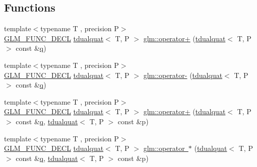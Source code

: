 \subsection*{Functions}
\begin{DoxyCompactItemize}
\item 
{\footnotesize template$<$typename T , precision P$>$ }\\\mbox{\hyperlink{setup_8hpp_ab2d052de21a70539923e9bcbf6e83a51}{G\+L\+M\+\_\+\+F\+U\+N\+C\+\_\+\+D\+E\+CL}} \mbox{\hyperlink{structglm_1_1tdualquat}{tdualquat}}$<$ T, P $>$ \mbox{\hyperlink{group__gtx__dual__quaternion_gaf14cf93205560472618c9f93a52a2e1f}{glm\+::operator+}} (\mbox{\hyperlink{structglm_1_1tdualquat}{tdualquat}}$<$ T, P $>$ const \&\mbox{\hyperlink{glad_8h_a514729309336df22bcc8eda979d6ced4}{q}})
\item 
{\footnotesize template$<$typename T , precision P$>$ }\\\mbox{\hyperlink{setup_8hpp_ab2d052de21a70539923e9bcbf6e83a51}{G\+L\+M\+\_\+\+F\+U\+N\+C\+\_\+\+D\+E\+CL}} \mbox{\hyperlink{structglm_1_1tdualquat}{tdualquat}}$<$ T, P $>$ \mbox{\hyperlink{group__gtx__dual__quaternion_ga90a25279ac4f392a823e8bf6dfaddb9b}{glm\+::operator-\/}} (\mbox{\hyperlink{structglm_1_1tdualquat}{tdualquat}}$<$ T, P $>$ const \&\mbox{\hyperlink{glad_8h_a514729309336df22bcc8eda979d6ced4}{q}})
\item 
{\footnotesize template$<$typename T , precision P$>$ }\\\mbox{\hyperlink{setup_8hpp_ab2d052de21a70539923e9bcbf6e83a51}{G\+L\+M\+\_\+\+F\+U\+N\+C\+\_\+\+D\+E\+CL}} \mbox{\hyperlink{structglm_1_1tdualquat}{tdualquat}}$<$ T, P $>$ \mbox{\hyperlink{group__gtx__dual__quaternion_ga9d7cfca38c6ff90757705600da3c7972}{glm\+::operator+}} (\mbox{\hyperlink{structglm_1_1tdualquat}{tdualquat}}$<$ T, P $>$ const \&\mbox{\hyperlink{glad_8h_a514729309336df22bcc8eda979d6ced4}{q}}, \mbox{\hyperlink{structglm_1_1tdualquat}{tdualquat}}$<$ T, P $>$ const \&p)
\item 
{\footnotesize template$<$typename T , precision P$>$ }\\\mbox{\hyperlink{setup_8hpp_ab2d052de21a70539923e9bcbf6e83a51}{G\+L\+M\+\_\+\+F\+U\+N\+C\+\_\+\+D\+E\+CL}} \mbox{\hyperlink{structglm_1_1tdualquat}{tdualquat}}$<$ T, P $>$ \mbox{\hyperlink{group__gtx__dual__quaternion_gacb43d8513f47848a1e228f7cfa47b4a8}{glm\+::operator $\ast$}} (\mbox{\hyperlink{structglm_1_1tdualquat}{tdualquat}}$<$ T, P $>$ const \&\mbox{\hyperlink{glad_8h_a514729309336df22bcc8eda979d6ced4}{q}}, \mbox{\hyperlink{structglm_1_1tdualquat}{tdualquat}}$<$ T, P $>$ const \&p)

\end{DoxyCompactItemize}
